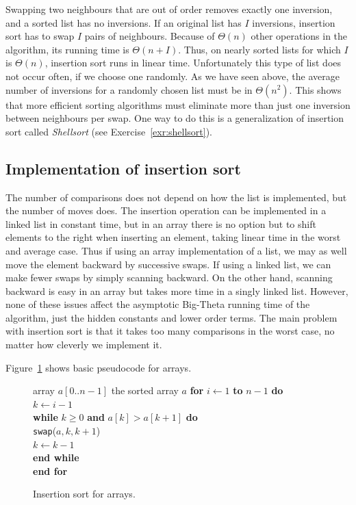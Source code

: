 Swapping two neighbours that are out of order removes exactly one inversion, 
and a sorted list has no inversions. If an original list has $I$ inversions, 
insertion sort has to swap $I$ pairs of neighbours. Because of $\Theta(n)$ 
other operations in the algorithm, its running time is $\Theta(n+I)$. 
Thus, on nearly sorted lists for which \(I\) is $\Theta(n)$, insertion sort 
runs in linear time. Unfortunately this type of list does not occur often, if 
we choose one randomly. As we have seen above, the average number of inversions 
for a randomly chosen list must be in $\Theta(n^2)$. This shows that more 
efficient sorting algorithms 
must eliminate more than just one inversion between neighbours per swap. One 
way to do this is a generalization of insertion sort called \emph{Shellsort}
(see Exercise~\ref{exr:shellsort}).

\subsection*{Implementation of insertion sort}

The number of comparisons does not depend on how the list is implemented, but 
the number of moves does. The insertion operation can be implemented in 
a linked list in constant time, but in an array there is no option but to shift 
elements to the right when inserting an element, taking linear time in the 
worst and average case. Thus if using an array 
implementation of a list, we may as well move the element backward by 
successive swaps. If using a linked list, we can make fewer swaps by simply 
scanning backward. On the other hand, scanning backward is easy 
in an array but takes more time in a singly linked list. However, none of 
these issues affect the asymptotic Big-Theta running time of the algorithm, 
just the hidden constants and lower order terms. The main problem with insertion
sort is that it takes too many comparisons in the worst case, no matter how 
cleverly we implement it.

Figure~\ref{f:is-sort2} shows basic pseudocode for arrays. 

\begin{figure}[htb!]
\hspace*{1in}\begin{minipage}{5in}
{array $a[0..n-1]$}
{the sorted array $a$}
{
\>\textbf{for} \(i \leftarrow 1\) \textbf{to} $n - 1$ \textbf{do}\\
\>\> \(k \leftarrow i-1\)\\
\>\> \textbf{while} \(k \ge 0 \) \textbf{and} 
 \(a[k] > a[k+1] \) \textbf{do}  \\
 \> \> \> \texttt{swap}($a,k,k+1$) \\
 \> \> \> \(k \leftarrow k-1\) \\
\>\>\textbf{end while} \\
\>\textbf{end for} \\
}
\end{minipage}
\caption{Insertion sort for arrays.}
\label{f:is-sort2}
\end{figure} 

